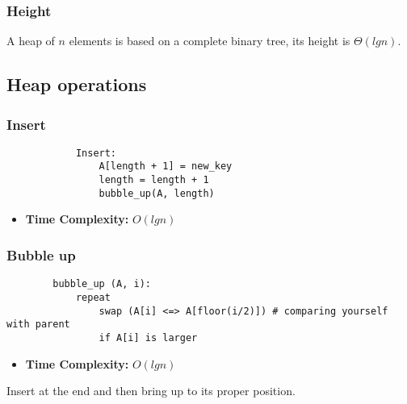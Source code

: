     \subsubsection{Height}
    \begin{definition}
        A heap of $n$ elements is based on a complete binary tree, its height is $\Theta(lg n)$.
    \end{definition}

\subsection{Heap operations}
    \subsubsection{Insert}
    \begin{definition}
        \begin{lstlisting}
            Insert:
                A[length + 1] = new_key
                length = length + 1
                bubble_up(A, length)
        \end{lstlisting}
        \begin{itemize}
            \item \textbf{Time Complexity:} $O(lg n)$
        \end{itemize}
    \end{definition}

    \subsubsection{Bubble up}
    \begin{definition}
        \begin{lstlisting}
        bubble_up (A, i):
            repeat
                swap (A[i] <=> A[floor(i/2)]) # comparing yourself with parent
                if A[i] is larger
        \end{lstlisting}
        \begin{itemize}
            \item \textbf{Time Complexity:} $O(lg n)$
        \end{itemize}
    \end{definition}
    
    \begin{intuition}
        Insert at the end and then bring up to its proper position.
    \end{intuition}

